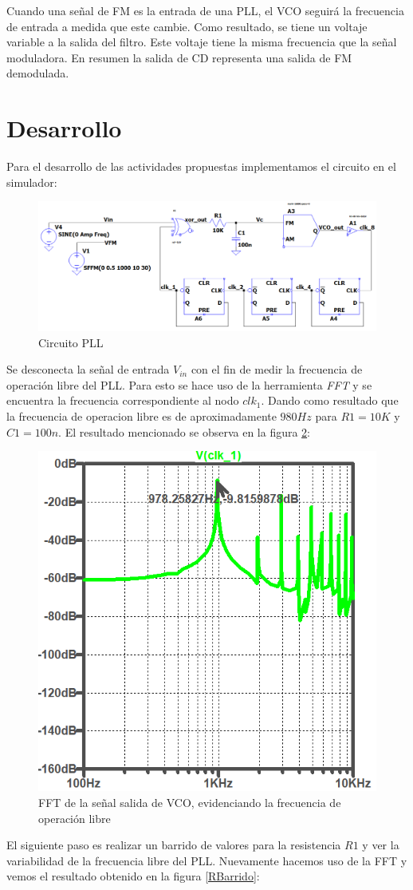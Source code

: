 \documentclass[10pt,a4paper]{IEEEtran}
\begin{document}
    Cuando una señal de FM es la entrada de una PLL, el VCO seguirá la frecuencia de entrada a medida que este cambie. Como resultado, se tiene un voltaje variable a la salida del filtro. Este voltaje tiene la misma frecuencia que la señal 
    moduladora. 
    En resumen la salida de CD representa una salida de FM demodulada.
\section{Desarrollo}
    Para el desarrollo de las actividades propuestas implementamos el circuito en el simulador:
    \begin{figure}[H]
        \centering
        \includegraphics[width=.45\textwidth]{Fig/CircuitoBase}
        \caption{Circuito PLL}
        \label{circuito}
    \end{figure}
Se desconecta la señal de entrada $V_{in}$ con el fin de medir la frecuencia de operación libre
del PLL. Para esto se hace uso de la herramienta \emph{FFT} y se encuentra la frecuencia correspondiente al nodo $clk_1$. Dando como resultado que la 
frecuencia de operacion libre es de aproximadamente $980Hz$ para $R1=10K$ y $C1=100n$. El resultado mencionado se observa 
en la figura \ref{Flibre}:
\begin{figure}[H]
    \centering
    \includegraphics[width=.45\textwidth]{Fig/FrecuenciaLibre_VCO16K_R10K_C100n}
    \caption{FFT de la señal salida de VCO, evidenciando la frecuencia de operación libre}
    \label{Flibre}
\end{figure}
El siguiente paso es realizar un barrido de valores para la resistencia $R1$ y ver la variabilidad de la frecuencia libre del PLL. Nuevamente 
hacemos uso de la FFT y vemos el resultado obtenido en la figura \ref{RBarrido}:
\end{document}
